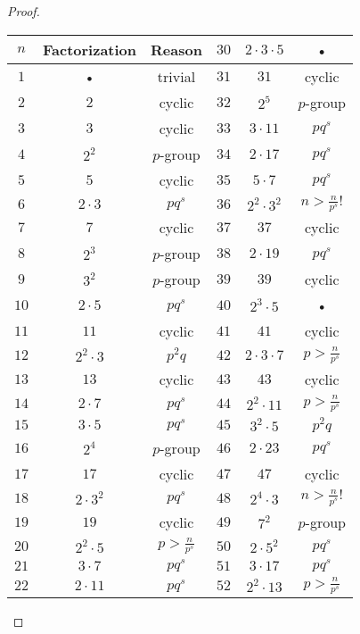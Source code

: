 \documentclass[10pt]{article}
\begin{document}
\begin{enumerate}
\begin{proof}
\begin{center}
\begin{tabular}{|c|c|c||c|c|c|}
\hline
$n$ & \textbf{Factorization} &  \textbf{Reason} & $30$ & $2 \cdot 3 \cdot 5$ & • \\ 
\hline 
$1$ & • & trivial & $31$ & $31$ & cyclic \\ 
\hline 
$2$ & $2$ & cyclic & $32$ & $2^5$ & $p$-group \\ 
\hline 
$3$ & $3$ & cyclic & $33$ & $3 \cdot 11$ & $pq^s$ \\ 
\hline 
$4$ & $2^2$ & $p$-group & $34$ & $2 \cdot 17$ & $pq^s$ \\ 
\hline 
$5$ & $5$ & cyclic & $35$ & $5 \cdot 7$ & $pq^s$ \\ 
\hline 
$6$ & $2\cdot 3$ & $pq^s$ & $36$ & $2^2 \cdot 3^2$ & $n > \frac{n}{p^s}!$ \\ 
\hline 
$7$ & $7$ & cyclic & $37$ & $37$ & cyclic \\ 
\hline 
$8$ & $2^3$ & $p$-group & $38$ & $2 \cdot 19$ & $pq^s$ \\ 
\hline 
$9$ & $3^2$ & $p$-group & $39$ & $39$ & cyclic \\ 
\hline 
$10$ & $2\cdot 5$ & $pq^s$ & $40$ & $2^3 \cdot 5$ & • \\ 
\hline 
$11$ & $11$ & cyclic & $41$ & $41$ & cyclic \\ 
\hline 
$12$ & $2^2 \cdot 3$ & $p^2q$ & $42$ & $2 \cdot 3 \cdot 7$ & $p > \frac{n}{p^s}$ \\ 
\hline 
$13$ & $13$ & cyclic & $43$ & $43$ & cyclic \\ 
\hline 
$14$ & $2 \cdot 7$ & $pq^s$ & $44$ & $2^2 \cdot 11$ & $p > \frac{n}{p^s}$ \\ 
\hline 
$15$ & $3\cdot 5$ & $pq^s$ & $45$ & $3^2 \cdot 5$ & $p^2q$ \\ 
\hline 
$16$ & $2^4$ & $p$-group & $46$ & $2 \cdot 23$ & $pq^s$ \\ 
\hline 
$17$ & $17$ & cyclic & $47$ & $47$ & cyclic \\ 
\hline 
$18$ & $2 \cdot 3^2$ & $pq^s$ & $48$ & $2^4 \cdot 3$ & $n > \frac{n}{p^s}!$ \\ 
\hline 
$19$ & $19$ & cyclic & $49$ & $7^2$ & $p$-group \\ 
\hline 
$20$ & $2^2 \cdot 5 $ & $p > \frac{n}{p^s}$& $50$ & $2 \cdot 5^2$ & $pq^s$ \\ 
\hline 
$21$ & $3 \cdot 7$ & $pq^s$ & $51$ & $3 \cdot 17$ & $pq^s$ \\ 
\hline 
$22$ & $2 \cdot 11$ & $pq^s$ & $52$ & $2^2 \cdot 13$ & $p > \frac{n}{p^s}$ \\ 

\end{tabular}
\end{center}
\end{proof}
\end{enumerate}
\end{document}
